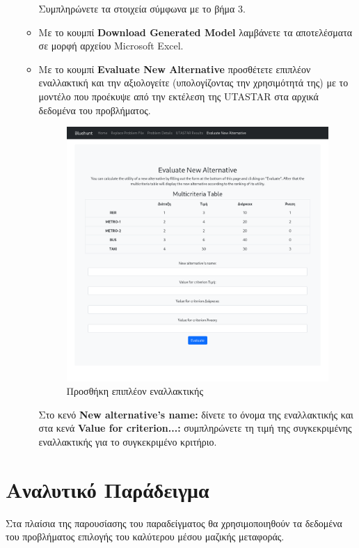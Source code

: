 \documentclass[11pt,a4paper,titlepage]{article}
\numberwithin{equation}{section}
\begin{document}
\begin{enumerate}
\begin{itemize}
		Συμπληρώνετε τα στοιχεία σύμφωνα με το βήμα 3.
				
		\item Με το κουμπί \textbf{Download Generated Model} λαμβάνετε τα αποτελέσματα σε μορφή αρχείου Microsoft Excel. 
		\item Με το κουμπί \textbf{Evaluate New Alternative} προσθέτετε επιπλέον εναλλακτική και την αξιολογείτε (υπολογίζοντας την χρησιμότητά της) με το μοντέλο που προέκυψε από την εκτέλεση της UTASTAR στα αρχικά δεδομένα του προβλήματος.
		
		\begin{figure}[H]
			\centering
			\includegraphics[width=0.8\linewidth]{media/evaluate.png}
			\caption{Προσθήκη επιπλέον εναλλακτικής}
			\label{fig:evaluate}
		\end{figure}
		
		Στο κενό \textbf{New alternative's name:} δίνετε το όνομα της εναλλακτικής και στα κενά \textbf{Value for criterion...:} συμπληρώνετε τη τιμή της συγκεκριμένης εναλλακτικής για το συγκεκριμένο κριτήριο.	
	\end{itemize}
\end{enumerate}

\section{Αναλυτικό Παράδειγμα}
\label{sec:example}

Στα πλαίσια της παρουσίασης του παραδείγματος θα χρησιμοποιηθούν τα δεδομένα του προβλήματος επιλογής του καλύτερου μέσου μαζικής μεταφοράς.
\end{document}

